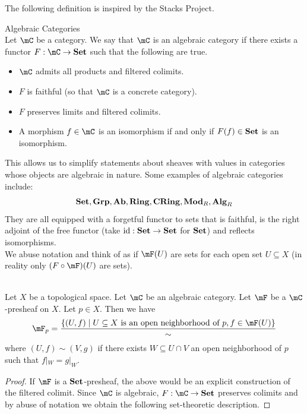 \documentclass[a4paper]{article}
\begin{document}
The following definition is inspired by the Stacks Project. 

\begin{defn}{Algebraic Categories}{}\\
Let $\mC$ be a category. We say that $\mC$ is an algebraic category if there exists a functor $F:\mC\to\bold{Set}$ such that the following are true. 
\begin{itemize}
\item $\mC$ admits all products and filtered colimits. 
\item $F$ is faithful (so that $\mC$ is a concrete category). 
\item $F$ preserves limits and filtered colimits. 
\item A morphism $f\in\mC$ is an isomorphism if and only if $F(f)\in\bold{Set}$ is an isomorphism. 
\end{itemize}
\end{defn}

This allows us to simplify statements about sheaves with values in categories whose objects are algebraic in nature. Some examples of algebraic categories include: $$\bold{Set},\bold{Grp},\bold{Ab},\bold{Ring},\bold{CRing},\bold{Mod}_R,\bold{Alg}_R$$ They are all equipped with a forgetful functor to sets that is faithful, is the right adjoint of the free functor (take $\text{id}:\bold{Set}\to\bold{Set}$ for $\bold{Set}$) and reflects isomorphisms. \\

We abuse notation and think of as if $\mF(U)$ are sets for each open set $U\subseteq X$ (in reality only $(F\circ\mF)(U)$ are sets). 

\begin{lmm}{}{}\\
Let $X$ be a topological space. Let $\mC$ be an algebraic category. Let $\mF$ be a $\mC$-presheaf on $X$. Let $p\in X$. Then we have $$\mF_p=\frac{\{(U,f)\;|\;U\subseteq X\text{ is an open neighborhood of }p, f\in\mF(U)\}}{\sim}$$ where $(U,f)\sim(V,g)$ if there exists $W\subseteq U\cap V$ an open neighborhood of $p$ such that $f|_W=g|_W$. 
\begin{proof}
If $\mF$ is a $\bold{Set}$-presheaf, the above would be an explicit construction of the filtered colimit. Since $\mC$ is algebraic, $F:\mC\to\bold{Set}$ preserves colimits and by abuse of notation we obtain the following set-theoretic description. 
\end{proof}
\end{lmm}
\end{document}
